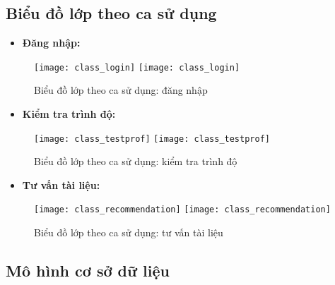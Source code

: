 \subsection{Biểu đồ lớp theo ca sử dụng}

\begin{itemize}
	\item \textbf{Đăng nhập:}
\end{itemize}

\begin{figure}[H]
  \begin{center}
    \ifpdf
      \texttt{[image: class\_login]}
    \else
      \texttt{[image: class\_login]}
    \fi
    \label{LoginClassDiagram}
    \caption{Biểu đồ lớp theo ca sử dụng: đăng nhập}
  \end{center}
\end{figure}

\pagebreak
\begin{itemize}
	\item \textbf{Kiểm tra trình độ:}
\end{itemize}

\begin{figure}[H]
  \begin{center}
    \ifpdf
      \texttt{[image: class\_testprof]}
    \else
      \texttt{[image: class\_testprof]}
    \fi
    \label{TestProficiencyDiagram}
    \caption{Biểu đồ lớp theo ca sử dụng: kiểm tra trình độ}
  \end{center}
\end{figure}

\pagebreak
\begin{itemize}
	\item \textbf{Tư vấn tài liệu:}
\end{itemize}

\begin{figure}[H]
  \begin{center}
    \ifpdf
      \texttt{[image: class\_recommendation]}
    \else
      \texttt{[image: class\_recommendation]}
    \fi
    \label{RecommendationDiagram}
    \caption{Biểu đồ lớp theo ca sử dụng: tư vấn tài liệu}
  \end{center}
\end{figure}

\pagebreak
\subsection{Mô hình cơ sở dữ liệu}

